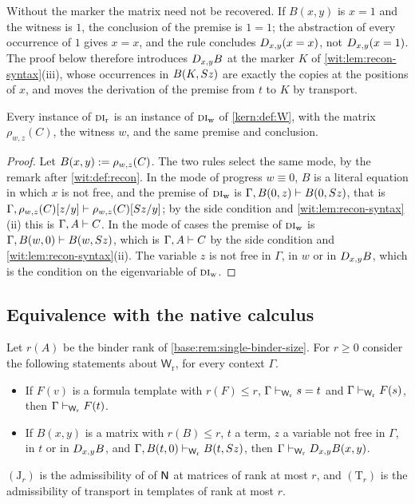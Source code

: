 Without the marker the matrix need not be recovered.  If $B(x,y)$ is $x=1$ and
the witness is $1$, the conclusion of the premise is $1=1$; the abstraction of
every occurrence of $1$ gives $x=x$, and the rule concludes $D_{x,y}(x=x)$,
not $D_{x,y}(x=1)$.  The proof below therefore introduces $D_{x,y}B$ at the
marker $K$ of \cref{wit:lem:recon-syntax}(iii), whose occurrences in
$B(K,S z)$ are exactly the copies at the positions of $x$, and moves the
derivation of the premise from $t$ to $K$ by transport.

\begin{lemma}
\label{wit:lem:recon-instance}
Every instance of $\rulename{DI}_{\mathrm{r}}$ is an instance of
$\rulename{DI}_{\mathrm{w}}$ of \cref{kern:def:W}, with the matrix
$\rho_{w,z}(C)$, the witness $w$, and the same premise and conclusion.
\end{lemma}

\begin{proof}
Let $B(x,y)\mathrel{:=}\rho_{w,z}(C)$.  The two rules select the same mode, by the
remark after \cref{wit:def:recon}.  In the mode of progress $w\equiv 0$, $B$ is
a literal equation in which $x$ is not free, and the premise of
$\rulename{DI}_{\mathrm{w}}$ is $\Gamma,B(0,z)\vdash B(0,S z)$, that is
$\Gamma,\rho_{w,z}(C)[z/y]\vdash\rho_{w,z}(C)[S z/y]$; by the
side condition and \cref{wit:lem:recon-syntax}(ii) this is
$\Gamma,A\vdash C$.  In the mode of cases the premise of
$\rulename{DI}_{\mathrm{w}}$ is $\Gamma,B(w,0)\vdash B(w,S z)$, which is
$\Gamma,A\vdash C$ by the side condition and
\cref{wit:lem:recon-syntax}(ii).  The variable $z$ is not free in $\Gamma$, in
$w$ or in $D_{x,y}B$, which is the condition on the eigenvariable of
$\rulename{DI}_{\mathrm{w}}$.
\end{proof}

\subsection{Equivalence with the native calculus}
\label{wit:sec:recon-equiv}

Let $r(A)$ be the binder rank of \cref{base:rem:single-binder-size}.  For
$r\ge 0$ consider the following statements about $\mathsf{W}_{\mathrm r}$,
for every context $\Gamma$.
\begin{itemize}
\item[$(\mathrm T_r)$] If $F(v)$ is a formula template with $r(F)\le r$,
 $\Gamma\vdash_{\mathsf{W}_{\mathrm r}}s=t$ and
 $\Gamma\vdash_{\mathsf{W}_{\mathrm r}}F(s)$, then
 $\Gamma\vdash_{\mathsf{W}_{\mathrm r}}F(t)$.
\item[$(\mathrm J_r)$] If $B(x,y)$ is a matrix with $r(B)\le r$, $t$ a term,
 $z$ a variable not free in $\Gamma$, in $t$ or in $D_{x,y}B$, and
 $\Gamma,B(t,0)\vdash_{\mathsf{W}_{\mathrm r}}B(t,S z)$, then
 $\Gamma\vdash_{\mathsf{W}_{\mathrm r}}D_{x,y}B(x,y)$.
\end{itemize}
$(\mathrm J_r)$ is the admissibility of  of $\mathsf{N}$ at matrices
of rank at most $r$, and $(\mathrm T_r)$ is the admissibility of transport in
templates of rank at most $r$.

